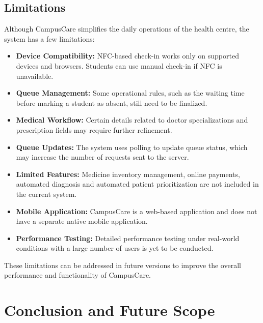 \documentclass[a4paper,oneside,openany]{tietreport}
\begin{document}
\section{Limitations}

Although CampusCare simplifies the daily operations of
the health centre, the system has a few limitations:

\begin{itemize}

    \item \textbf{Device Compatibility:}
    NFC-based check-in works only on supported devices
    and browsers. Students can use manual check-in
    if NFC is unavailable.

    \item \textbf{Queue Management:}
    Some operational rules, such as the waiting time
    before marking a student as absent, still need
    to be finalized.

    \item \textbf{Medical Workflow:}
    Certain details related to doctor specializations
    and prescription fields may require further
    refinement.

    \item \textbf{Queue Updates:}
    The system uses polling to update queue status,
    which may increase the number of requests sent
    to the server.

    \item \textbf{Limited Features:}
    Medicine inventory management, online payments,
    automated diagnosis and automated patient
    prioritization are not included in the current
    system.

    \item \textbf{Mobile Application:}
    CampusCare is a web-based application and does
    not have a separate native mobile application.

    \item \textbf{Performance Testing:}
    Detailed performance testing under real-world
    conditions with a large number of users is yet
    to be conducted.

\end{itemize}

These limitations can be addressed in future versions
to improve the overall performance and functionality
of CampusCare.
\chapter{Conclusion and Future Scope}
\end{document}
